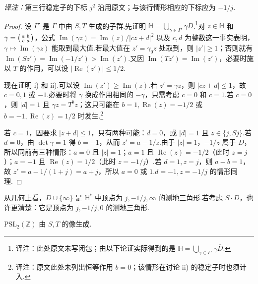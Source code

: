 \noindent\textit{译注：}第三行稳定子的下标 $j^2$ 沿用原文；与该行情形相应的下标应为 $-1/j$.

\begin{proof}

设 $\Gamma'$ 是 $\Gamma$ 中由 $S,T$ 生成的子群.先证明 $\mathbb H=\bigcup_{\gamma\in\Gamma'}\gamma D$.\footnote{译注：此处原文未写闭包；由以下论证实际得到的是 $\mathbb H=\bigcup_{\gamma\in\Gamma'}\gamma\overline D$.}对 $z\in\mathbb H$ 和 $\gamma=\begin{psmallmatrix}a&b\\c&d\end{psmallmatrix}$，公式 $\operatorname{Im}(\gamma z)=\operatorname{Im}(z)/|cz+d|^2$ 以及 $c,d$ 为整数这一事实表明，$\gamma\mapsto\operatorname{Im}(\gamma z)$ 能取到最大值.若最大值在 $z'=\gamma_0z$ 处取到，则 $|z'|\ge1$；否则就有 $\operatorname{Im}(Sz')=\operatorname{Im}(-1/z')>\operatorname{Im}(z')$.又因 $\operatorname{Im}(Tz')=\operatorname{Im}(z')$，必要时施以 $T$ 的作用，可以设 $|\operatorname{Re}(z')|\le1/2$.



现在证明 i) 和 ii).可以设 $\operatorname{Im}(z')\ge\operatorname{Im}(z)$.若 $z'=\gamma z$，则 $|cz+d|\le1$，故 $c=0,1$ 或 $-1$.必要时将 $\gamma$ 换成作用相同的 $-\gamma$，只需考虑 $c=0$ 和 $c=1$.若 $c=0$，则 $|d|=1$ 且 $\gamma z=T^bz$；这只可能在 $b=1,\operatorname{Re}(z)=-1/2$ 或 $b=-1,\operatorname{Re}(z)=1/2$ 时发生.\footnote{译注：原文此处未列出恒等作用 $b=0$；该情形在讨论 ii) 的稳定子时也须计入.}

若 $c=1$，因要求 $|z+d|\le1$，只有两种可能：$d=0$，或 $|d|=1$ 且 $z\in\{j,Sj\}$.若 $d=0$，由 $\det\gamma=1$ 得 $b=-1$，从而 $z'=a-1/z$.由于 $|z|=1$，$-1/z$ 属于 $\overline D$，所以同前有三种情形：$a=0$ 且 $|z|=1$；$a=1$ 且 $\operatorname{Re}(z)=-1/2$（此时 $z=j$）；$a=-1$ 且 $\operatorname{Re}(z)=1/2$（此时 $z=-1/j$）.若 $d=1,z=j$，则 $a-b=1$，故 $z'=a-1/(1+j)=a+j$，所以 $a=0$ 或 $1$.$d=-1,z=-1/j$ 的情形同理.

\end{proof}

\begin{remark*}

从几何上看，$D\cup\{\infty\}$ 是 $\mathbb H^*$ 中顶点为 $j,-1/j,\infty$ 的测地三角形.若考虑 $S\cdot D$，也许更清楚：它是顶点为 $j,-1/j,0$ 的测地三角形.

\end{remark*}

\begin{corollary*}

$\mathrm{PSL}_2(\mathbb Z)$ 由 $S,T$ 的像生成.

\end{corollary*}

